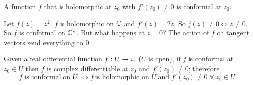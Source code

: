 \begin{lemma}[]
    A function $f$ that is holomorphic at $z_0$ with $f'(z_0) \neq 0$ is conformal at $z_0$.
\end{lemma}

\begin{example}
    Let $f(z) = z^2$. $f$ is holomorphic on $\mathbb{C}$ and $f'(z) = 2z$. So $f(z) \neq 0 \iff z \neq 0$. So $f$ is conformal on $\mathbb{C}^\star$. But what happens at $z = 0$? The action of $f$ on tangent vectors send everything to $0$.
\end{example}

\begin{proposition}
    Given a real differential function $f: U \to \mathbb{C}$ ($U$ is open), if $f$ is conformal at $z_0 \in U$ then $f$ is complex differentiable at $z_0$ and $f'(z_0) \neq 0$; therefore
    \[ f \;\text{is conformal on $U$}\; \iff f \;\text{is holomorphic on $U$ and}\; f'(z_0) \neq 0 \;\forall\; z_0 \in U. \]
\end{proposition}
